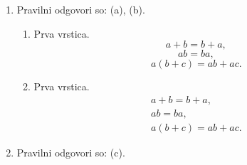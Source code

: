 \documentclass[11pt]{article}
\begin{document}
\begin{enumerate}
    \item Pravilni odgovori so: (a), (b).
    \begin{enumerate}
        \item Prva vrstica.
\[ a + b = b + a, \]
\[ a b = b a, \]
\[ a (b + c) = a b + a c. \]
        \item Prva vrstica.
\begin{gather*}
  a + b = b + a, \\
  a b = b a, \\
  a (b + c) = a b + a c.
\end{gather*}
    \end{enumerate}

    \item Pravilni odgovori so: (c).

\end{enumerate}
\end{document}
